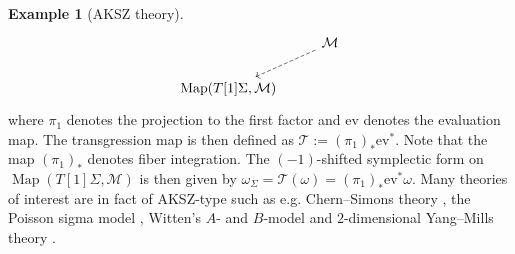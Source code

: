 \documentclass[11pt,colorinlistoftodos]{amsart}
\numberwithin{equation}{subsection}
\theoremstyle{plain}
\theoremstyle{definition}
\newtheorem{ex}[thm]{Example}
\theoremstyle{remark}
\newcommand{\calM}{\mathcal{M}}
\DeclareMathOperator{\Map}{Map}
\begin{document}
\begin{ex}[AKSZ theory\cite{AKSZ}]
\[\begin{tikzcd}
      & \calM\arrow[dl,dashed]\\
\Map(T[1]\Sigma,\calM) & \end{tikzcd}
\]
where $\pi_1$ denotes the projection to the first factor and $\mathrm{ev}$ denotes the evaluation map. The transgression map is then defined as $\mathscr{T}:=(\pi_1)_*\mathrm{ev}^*$. Note that the map $(\pi_1)_*$ denotes fiber integration. The $(-1)$-shifted symplectic form on $\Map(T[1]\Sigma,\calM)$ is then given by $\omega_\Sigma=\mathscr{T}(\omega)=(\pi_1)_*\mathrm{ev}^*\omega$.
Many theories of interest are in fact of AKSZ-type such as e.g. Chern--Simons theory \cite{Witten1989,AS,AS2}, the Poisson sigma model \cite{CF1,CF4}, Witten's $A$- and $B$-model \cite{Witten1988a,AKSZ} and $2$-dimensional Yang--Mills theory \cite{IM}.
\end{ex}
\end{document}
